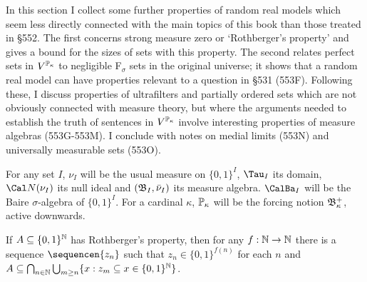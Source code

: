 
\def\chaptername{Possible worlds}
\def\sectionname{Random reals II}

\Loadfourteens

\def\BbbPk{\Bbb P_{\kappa}}
\long{}
\def\Fn{\mathop{\text{Fn}}\nolimits}
\def\rank{\mathop{\text{rank}}}
\def\VVdash{\mskip5mu\vrule height 7.5pt depth 2.5pt width 0.5pt
  \mskip2.5mu\vrule height 7.5pt depth 2.5pt width 0.5pt
  \vrule height 2.75pt depth -2.25pt width 4pt\mskip2mu}
\def\VVdPk{\VVdash_{\Bbb P_{\kappa}}}
\def\VVdP{\VVdash_{\Bbb P}}


In this section I collect some further properties of random real models
which seem less directly connected with the main topics of this book than
those treated in \S552.   The first concerns strong measure zero or
`Rothberger's property' and
gives a bound for the sizes of sets with this property.
The second relates
perfect sets in $V^{\Bbb P_{\kappa}}$ to negligible F$_{\sigma}$ sets in
the original universe;  it shows that a random real model can have
properties relevant to a question in \S531 (553F).
Following these, I discuss properties of ultrafilters and partially
ordered sets which are not obviously connected with measure theory,
but where the arguments needed to establish the truth of sentences in
$V^{\Bbb P_{\kappa}}$ involve interesting properties of measure algebras
(553G-553M).   I conclude with notes on medial limits (553N) and
universally measurable sets (553O).


For any set $I$, $\nu_I$ will be
the usual measure on $\{0,1\}^I$, $\Tau_I$ its domain,
$\Cal N(\nu_I)$ its null ideal and
$(\frak B_I,\bar\nu_I)$
its measure algebra.   $\CalBa_I$ will be the
Baire $\sigma$-algebra of $\{0,1\}^I$.   For a cardinal $\kappa$,
$\BbbPk$ will be the forcing notion
$\frak B_{\kappa}^+$, active downwards.

 If $A\subseteq\{0,1\}^{\Bbb N}$ has Rothberger's
property,
then for any $f:\Bbb N\to\Bbb N$ there is a sequence $\sequencen{z_n}$ such
that $z_n\in\{0,1\}^{f(n)}$ for each $n$ and
$A\subseteq\bigcap_{n\in\Bbb N}
\bigcup_{m\ge n}\{x:z_m\subseteq x\in\{0,1\}^{\Bbb N}\}$.

